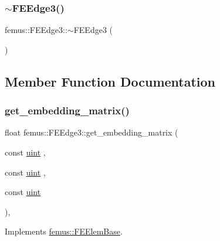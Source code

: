 \subsubsection{\texorpdfstring{$\sim$\+F\+E\+Edge3()}{~FEEdge3()}}
{\footnotesize\ttfamily femus\+::\+F\+E\+Edge3\+::$\sim$\+F\+E\+Edge3 (\begin{DoxyParamCaption}{ }\end{DoxyParamCaption})}



\subsection{Member Function Documentation}
\mbox{\label{classfemus_1_1_f_e_edge3_a89085312a08628bcff678c347c0a82e4}} 
\subsubsection{\texorpdfstring{get\+\_\+embedding\+\_\+matrix()}{get\_embedding\_matrix()}}
{\footnotesize\ttfamily float femus\+::\+F\+E\+Edge3\+::get\+\_\+embedding\+\_\+matrix (\begin{DoxyParamCaption}\item[{const \mbox{\hyperlink{_typedefs_8hpp_a91ad9478d81a7aaf2593e8d9c3d06a14}{uint}}}]{,  }\item[{const \mbox{\hyperlink{_typedefs_8hpp_a91ad9478d81a7aaf2593e8d9c3d06a14}{uint}}}]{,  }\item[{const \mbox{\hyperlink{_typedefs_8hpp_a91ad9478d81a7aaf2593e8d9c3d06a14}{uint}}}]{ }\end{DoxyParamCaption})\hspace{0.3cm}{\ttfamily [inline]}, {\ttfamily [virtual]}}



Implements \mbox{\hyperlink{classfemus_1_1_f_e_elem_base_a0c4d6d5ec66bd4e301eb8ea2ef10f354}{femus\+::\+F\+E\+Elem\+Base}}.

\mbox{\label{classfemus_1_1_f_e_edge3_a5ecf7d9b06c59a94e3f1da042afe2b71}} 
